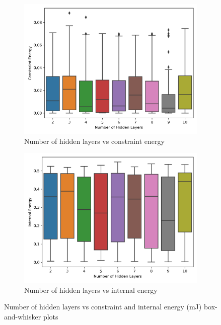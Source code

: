 \begin{figure}[H]
	\centering
	\begin{subfigure}[t]{0.45\textwidth}
		\centering
		\includegraphics[width=\textwidth]{nhl_vs_ce.png}
		\caption{Number of hidden layers vs constraint energy}
	\end{subfigure}
	\hfill
	\begin{subfigure}[t]{0.45\textwidth}
		\centering
		\includegraphics[width=\textwidth]{nhl_vs_ie.png}
		\caption{Number of hidden layers vs internal energy}
	\end{subfigure}
	\caption[Number of hidden layers vs system energies]{Number of hidden layers vs constraint and internal energy (\si{mJ}) box-and-whisker plots}
	\label{fig:nhl_v_e}
\end{figure}

